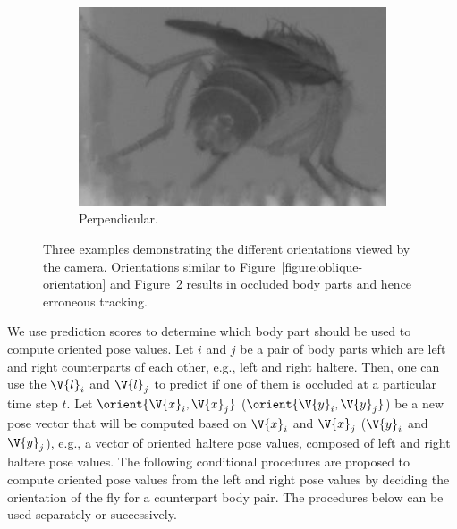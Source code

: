 \begin{figure}[ht!]
\begin{subfigure}[b]{0.3\linewidth}
		\centering\includegraphics[width=\linewidth]{figures/FlyOrientation-Perpendicular.png}
		\caption{Perpendicular.\label{figure:perpendicular-orientation}}
	\end{subfigure}
	\caption[Three examples demonstrating the different orientations viewed by the camera.]    {Three examples demonstrating the different orientations viewed by the camera. Orientations similar to Figure~\ref{figure:oblique-orientation} and Figure~\ref{figure:perpendicular-orientation} results in occluded body parts and hence erroneous tracking.}
\end{figure}

We use prediction scores to determine which body part should be used to compute oriented pose values.
Let $i$ and $j$ be a pair of body parts which are left and right counterparts of each other, e.g., left and right haltere.
Then, one can use the $\V{l}_i$ and $\V{l}_j$ to predict if one of them is occluded at a particular time step $t$.
Let $\orient{\V{x}_i, \V{x}_j}$ ($\orient{\V{y}_i, \V{y}_j}$) be a new pose vector that will be computed based on $\V{x}_i$ and $\V{x}_j$ ($\V{y}_i$ and $\V{y}_j$), e.g., a vector of oriented haltere pose values, composed of left and right haltere pose values.
The following conditional procedures are proposed to compute oriented pose values from the left and right pose values by deciding the orientation of the fly for a counterpart body pair. The procedures below can be used separately or successively.

